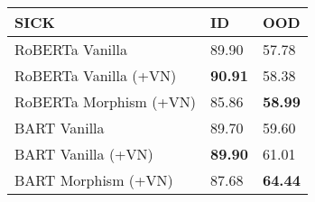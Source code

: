 \begin{tabularx}{1.2\linewidth}{ l *{2}{Z} }
\hline
\textbf{SICK} & \textbf{ID}& \textbf{OOD} \\
\hline
RoBERTa Vanilla  & 89.90 & 57.78 \\
RoBERTa Vanilla (+VN) & \textbf{90.91} & 58.38 \\
RoBERTa Morphism (+VN) & 85.86 & \textbf{58.99}\\
\hline
BART Vanilla  & 89.70 & 59.60   \\
BART Vanilla (+VN) & \textbf{89.90} & 61.01   \\
BART Morphism (+VN) &  87.68 & \textbf{64.44}   \\
\hline
\end{tabularx}